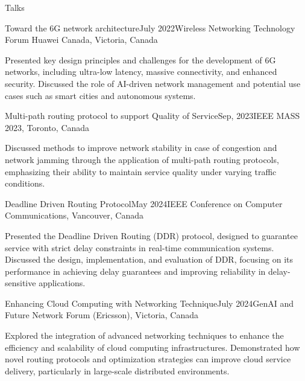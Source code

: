 \documentclass[]{puyang-resume}
\begin{document}
\begin{section}{Talks}

\begin{subsection}{Toward the 6G network architecture}{}{July 2022}{Wireless Networking Technology Forum Huawei Canada, Victoria, Canada}
 \item Presented key design principles and challenges for the development of 6G networks, including ultra-low latency, massive connectivity, and enhanced security. Discussed the role of AI-driven network management and potential use cases such as smart cities and autonomous systems.
 \end{subsection}
 
 \begin{subsection}{Multi-path routing protocol to support Quality of Service}{}{Sep, 2023}{IEEE MASS 2023, Toronto, Canada}
 \item Discussed methods to improve network stability in case of congestion and network jamming through the application of multi-path routing protocols, emphasizing their ability to maintain service quality under varying traffic conditions.
 \end{subsection}

 \begin{subsection}{Deadline Driven Routing Protocol}{}{May 2024}{IEEE Conference on Computer Communications, Vancouver, Canada}
 \item Presented the Deadline Driven Routing (DDR) protocol, designed to guarantee service with strict delay constraints in real-time communication systems. Discussed the design, implementation, and evaluation of DDR, focusing on its performance in achieving delay guarantees and improving reliability in delay-sensitive applications.
 \end{subsection}

 \begin{subsection}{Enhancing Cloud Computing with Networking Technique}{}{July 2024}{GenAI and Future Network Forum (Ericsson), Victoria, Canada}
 \item Explored the integration of advanced networking techniques to enhance the efficiency and scalability of cloud computing infrastructures. Demonstrated how novel routing protocols and optimization strategies can improve cloud service delivery, particularly in large-scale distributed environments.
 \end{subsection}
\end{section}
\end{document}
